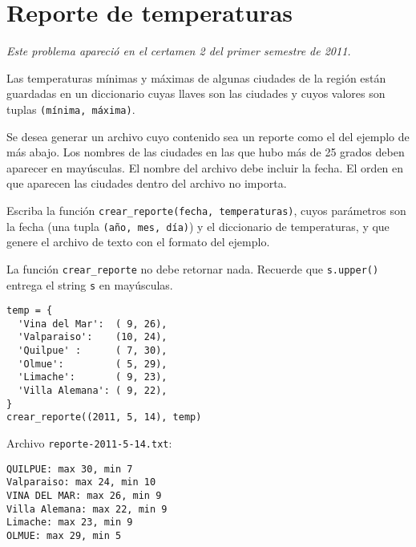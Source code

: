 \section{Reporte de temperaturas}

\emph{Este problema apareció en el certamen 2 del primer semestre de
2011.}

Las temperaturas mínimas y máximas de algunas ciudades de la región
están guardadas en un diccionario cuyas llaves son las ciudades y cuyos
valores son tuplas \lstinline!(mínima, máxima)!.

Se desea generar un archivo cuyo contenido sea un reporte como el del
ejemplo de más abajo. Los nombres de las ciudades en las que hubo más de
25 grados deben aparecer en mayúsculas. El nombre del archivo debe
incluir la fecha. El orden en que aparecen las ciudades dentro del
archivo no importa.

Escriba la función \lstinline!crear_reporte(fecha, temperaturas)!, cuyos
parámetros son la fecha (una tupla \lstinline!(año, mes, día)!) y el
diccionario de temperaturas, y que genere el archivo de texto con el
formato del ejemplo.

La función \lstinline!crear_reporte! no debe retornar nada. Recuerde que
\lstinline!s.upper()! entrega el string \lstinline!s! en mayúsculas.

\begin{lstlisting}
temp = {
  'Vina del Mar':  ( 9, 26),
  'Valparaiso':    (10, 24),
  'Quilpue' :      ( 7, 30),
  'Olmue':         ( 5, 29),
  'Limache':       ( 9, 23),
  'Villa Alemana': ( 9, 22),
}
crear_reporte((2011, 5, 14), temp)
\end{lstlisting}

Archivo \lstinline!reporte-2011-5-14.txt!:

\begin{lstlisting}
QUILPUE: max 30, min 7
Valparaiso: max 24, min 10
VINA DEL MAR: max 26, min 9
Villa Alemana: max 22, min 9
Limache: max 23, min 9
OLMUE: max 29, min 5
\end{lstlisting}

